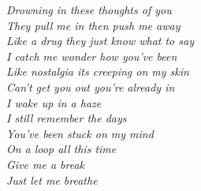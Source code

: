 
\textit{Drowning in these thoughts of you\\
They pull me in then push me away\\
Like a drug they just know what to say\\
I catch me wonder how you've been\\
Like nostalgia its creeping on my skin\\
Can't get you out you're already in\\
I wake up in a haze\\
I still remember the days\\
You've been stuck on my mind\\
On a loop all this time\\
Give me a break\\
Just let me breathe}
